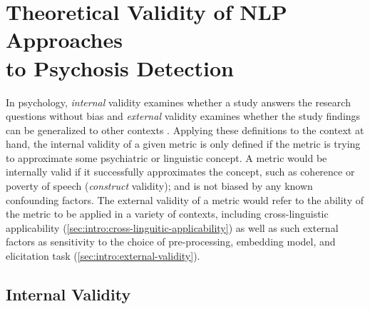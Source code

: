

\section{Theoretical Validity of NLP Approaches \\ to Psychosis Detection}
\label{sec:intro:validity}

In psychology, \textit{internal} validity examines whether a study answers the research questions without bias and \textit{external} validity examines whether the study findings can be generalized to other contexts \citep{andrade2018internal}. Applying these definitions to the context at hand, the internal validity of a given metric is only defined if the metric is trying to approximate some psychiatric or linguistic concept. A metric would be internally valid if it successfully approximates the concept, such as coherence or poverty of speech (\textit{construct} validity); and is not biased by any known confounding factors. The external validity of a metric would refer to the ability of the metric to be applied in a variety of contexts, including cross-linguistic applicability (\ref{sec:intro:cross-linguitic-applicability}) as well as such external factors as sensitivity to the choice of pre-processing, embedding model, and elicitation task (\ref{sec:intro:external-validity}).

\subsection{Internal Validity}
\label{sec:intro:internal-validity}

